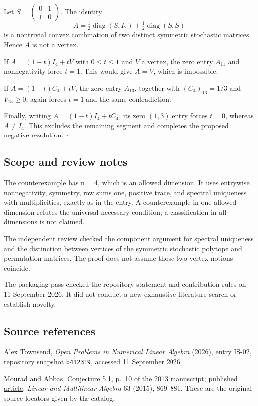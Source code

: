 \documentclass[10pt,a4paper]{article}
\begin{document}
Let \(S=\begin{pmatrix}0&1\\1&0\end{pmatrix}\). The identity \[
A=\tfrac12\operatorname{diag}(S,I_2)
  +\tfrac12\operatorname{diag}(S,S)
\] is a nontrivial convex combination of two distinct symmetric
stochastic matrices. Hence \(A\) is not a vertex.

If \(A=(1-t)I_4+tV\) with \(0\le t\le1\) and \(V\) a vertex, the zero
entry \(A_{11}\) and nonnegativity force \(t=1\). This would give
\(A=V\), which is impossible.

If \(A=(1-t)C_4+tV\), the zero entry \(A_{13}\), together with
\((C_4)_{13}=1/3\) and \(V_{13}\ge0\), again forces \(t=1\) and the same
contradiction.

Finally, writing \(A=(1-t)I_4+tC_4\), its zero \((1,3)\) entry forces
\(t=0\), whereas \(A\ne I_4\). This excludes the remaining segment and
completes the proposed negative resolution. \(\square\)

\subsection{Scope and review notes}\label{scope-and-review-notes}

The counterexample has n = 4, which is an allowed dimension. It uses
entrywise nonnegativity, symmetry, row sums one, positive trace, and
spectral uniqueness with multiplicities, exactly as in the entry. A
counterexample in one allowed dimension refutes the universal necessary
condition; a classification in all dimensions is not claimed.

The independent review checked the component argument for spectral
uniqueness and the distinction between vertices of the symmetric
stochastic polytope and permutation matrices. The proof does not assume
those two vertex notions coincide.

The packaging pass checked the repository statement and contribution
rules on 11 September 2026. It did not conduct a new exhaustive
literature search or establish novelty.

\subsection{Source references}\label{source-references}

Alex Townsend, \emph{Open Problems in Numerical Linear Algebra} (2026),
\href{https://github.com/ajt60gaibb/OpenProblemsInNLA/blob/b4123194697bdf6f8f82518c1dd7d6c40a30c2e0/eigenvalues-and-inverse-problems/IS-02/README.md}{entry
IS-02}, repository snapshot \texttt{b412319}, accessed 11 September
2026.

Mourad and Abbas, Conjecture 5.1, p.~10 of the
\href{https://arxiv.org/abs/1310.1273}{2013 manuscript};
\href{https://doi.org/10.1080/03081087.2014.903590}{published article},
\emph{Linear and Multilinear Algebra} 63 (2015), 869--881. These are the
original-source locators given by the catalog.
\end{document}
